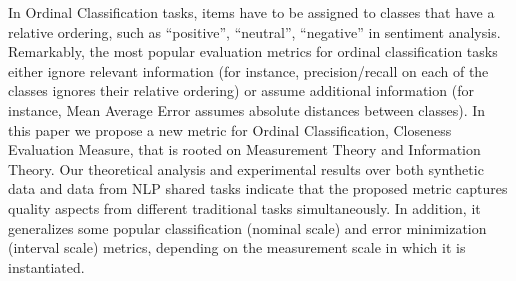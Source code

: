 In Ordinal Classification tasks, items have to be assigned to classes that have a relative ordering, such as ``positive'', ``neutral'', ``negative'' in sentiment analysis. Remarkably, the most popular evaluation metrics for ordinal classification tasks either ignore relevant information (for instance, precision/recall on each of the classes ignores their relative ordering) or assume additional information (for instance, Mean Average Error assumes absolute distances between classes). In this paper we propose a new metric for Ordinal Classification, Closeness Evaluation Measure, that is rooted on Measurement Theory and Information Theory. Our theoretical analysis and experimental results over both synthetic data and data from NLP shared tasks indicate that the proposed metric captures quality aspects from different traditional tasks simultaneously. In addition, it generalizes some popular classification (nominal scale) and error minimization (interval scale) metrics, depending on the measurement scale in which it is instantiated.
